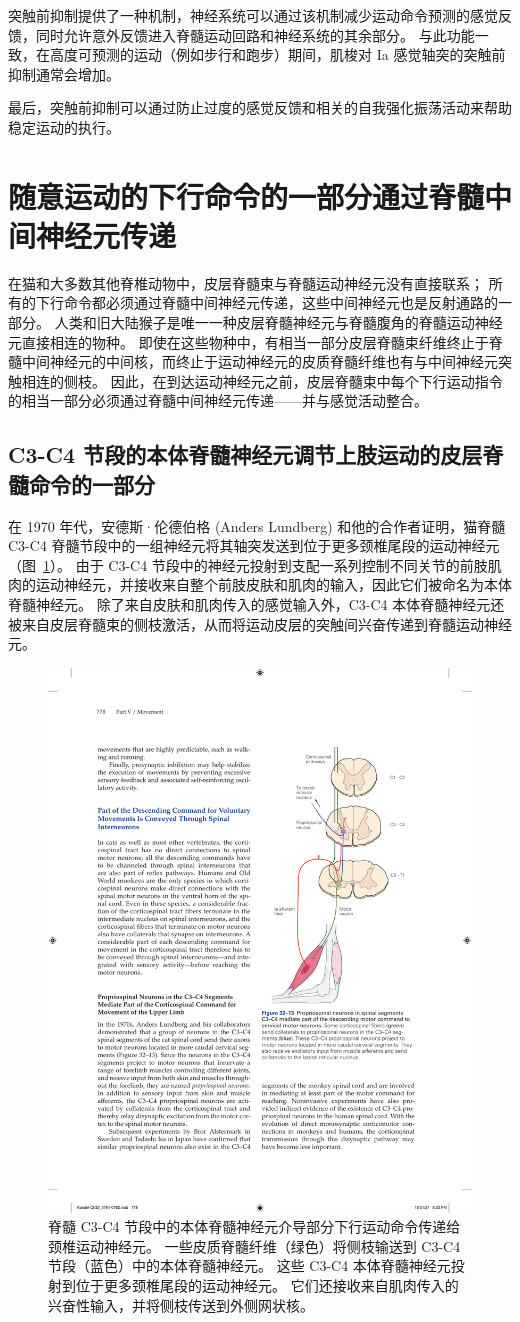 突触前抑制提供了一种机制，神经系统可以通过该机制减少运动命令预测的感觉反馈，同时允许意外反馈进入脊髓运动回路和神经系统的其余部分。
与此功能一致，在高度可预测的运动（例如步行和跑步）期间，肌梭对 Ia 感觉轴突的突触前抑制通常会增加。


最后，突触前抑制可以通过防止过度的感觉反馈和相关的自我强化振荡活动来帮助稳定运动的执行。



\section{随意运动的下行命令的一部分通过脊髓中间神经元传递}

在猫和大多数其他脊椎动物中，皮层脊髓束与脊髓运动神经元没有直接联系；
所有的下行命令都必须通过脊髓中间神经元传递，这些中间神经元也是反射通路的一部分。
人类和旧大陆猴子是唯一一种皮层脊髓神经元与脊髓腹角的脊髓运动神经元直接相连的物种。
即使在这些物种中，有相当一部分皮层脊髓束纤维终止于脊髓中间神经元的中间核，而终止于运动神经元的皮质脊髓纤维也有与中间神经元突触相连的侧枝。
因此，在到达运动神经元之前，皮层脊髓束中每个下行运动指令的相当一部分必须通过脊髓中间神经元传递——并与感觉活动整合。



\subsection{C3-C4 节段的本体脊髓神经元调节上肢运动的皮层脊髓命令的一部分}

在 1970 年代，安德斯·伦德伯格 (Anders Lundberg) 和他的合作者证明，猫脊髓 C3-C4 脊髓节段中的一组神经元将其轴突发送到位于更多颈椎尾段的运动神经元（图~\ref{fig:32_13}）。
由于 C3-C4 节段中的神经元投射到支配一系列控制不同关节的前肢肌肉的运动神经元，并接收来自整个前肢皮肤和肌肉的输入，因此它们被命名为本体脊髓神经元。
除了来自皮肤和肌肉传入的感觉输入外，C3-C4 本体脊髓神经元还被来自皮层脊髓束的侧枝激活，从而将运动皮层的突触间兴奋传递到脊髓运动神经元。


\begin{figure}[htbp]
	\centering
	\includegraphics[width=0.5\linewidth]{chap32/fig_32_13}
	\caption{脊髓 C3-C4 节段中的本体脊髓神经元介导部分下行运动命令传递给颈椎运动神经元。 一些皮质脊髓纤维（绿色）将侧枝输送到 C3-C4 节段（蓝色）中的本体脊髓神经元。 这些 C3-C4 本体脊髓神经元投射到位于更多颈椎尾段的运动神经元。 它们还接收来自肌肉传入的兴奋性输入，并将侧枝传送到外侧网状核。}
	\label{fig:32_13}
\end{figure}


